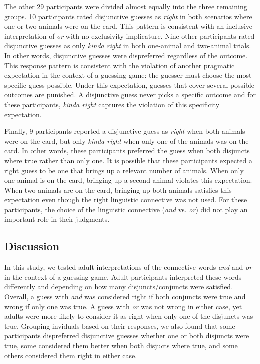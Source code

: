 \documentclass[10pt, letterpaper]{article}
\begin{document}
The other 29 participants were divided almost equally into the three
remaining groups. 10 participants rated disjunctive guesses as
\emph{right} in both scenarios where one or two animals were on the
card. This pattern is consistent with an inclusive interpretation of
\emph{or} with no exclusivity implicature. Nine other participants rated
disjunctive guesses as only \emph{kinda right} in both one-animal and
two-animal trials. In other words, disjunctive guesses were dispreferred
regardless of the outcome. This response pattern is consistent with the
violation of another pragmatic expectation in the context of a guessing
game: the guesser must choose the most specific guess possible. Under
this expectation, guesses that cover several possible outcomes are
punished. A disjunctive guess never picks a specific outcome and for
these participants, \emph{kinda right} captures the violation of this
specificity expectation.

Finally, 9 participants reported a disjunctive guess as \emph{right}
when both animals were on the card, but only \emph{kinda right} when
only one of the animals was on the card. In other words, these
participants preferred the guess when both disjuncts where true rather
than only one. It is possible that these participants expected a right
guess to be one that brings up a relevant number of animals. When only
one animal is on the card, bringing up a second animal violates this
expectation. When two animals are on the card, bringing up both animals
satisfies this expectation even though the right linguistic connective
was not used. For these participants, the choice of the linguistic
connective (\emph{and} vs. \emph{or}) did not play an important role in
their judgments.

\subsection{Discussion}\label{discussion}

In this study, we tested adult interpretations of the connective words
\emph{and} and \emph{or} in the context of a guessing game. Adult
participants interpreted these words differently and depending on how
many disjuncts/conjuncts were satisfied. Overall, a guess with
\emph{and} was considered right if both conjuncts were true and wrong if
only one was true. A guess with \emph{or} was not wrong in either case,
yet adults were more likely to consider it as right when only one of the
disjuncts was true. Grouping inviduals based on their responses, we also
found that some participants dispreferred disjunctive guesses whether
one or both disjuncts were true, some considered them better when both
disjucts where true, and some others considered them right in either
case.
\end{document}

